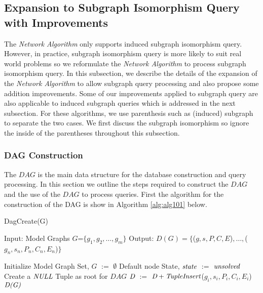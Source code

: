 \subsection{Expansion to Subgraph Isomorphism Query with Improvements}
The \textit{Network Algorithm} only supports induced subgraph isomorphism query. However, in practice,  subgraph isomorphism query is more likely to suit
real world problems so we reformulate the \textit{Network Algorithm} to process subgraph isomorphism query.
In this subsection, we describe the details of the expansion of the \textit{Network Algorithm} to allow subgraph query processing and also propose some addition improvements.
Some of our improvements applied to subgraph query are also applicable to induced subgraph queries which is addressed in the next subsection.
For these algorithms, we use parenthesis such as (induced) subgraph to separate the two cases. We first discuss the subgraph isomorphism so ignore the 
inside of the parentheses throughout this subsection.

\subsubsection{DAG Construction}
The $DAG$ is the main data structure for the database construction and query processing. In this section we outline the steps required to construct 
the $DAG$ and the use of the $DAG$ to process queries. First the algorithm for the construction of the DAG is show in Algorithm \ref{alg:alg101} below.


\begin{algorithm}
\caption{DagCreate(G)}
\label{alg:alg101}
\begin{algorithmic}
\STATE Input: Model Graphs $G$=$\{g_1,g_2,\dots,g_m\}$
\STATE Output: $D(G)= \{$($g,s,P,C,E$)$,\ldots,$($g_n,s_n,P_n,C_n,E_n$)$ \}$
\end{algorithmic}
\begin{algorithmic}[1]
\STATE Initialize Model Graph Set, $G$ $:=$ $\emptyset$
\STATE Default node State, $\emph{state}$ $:=$ $\emph{unsolved}$
\STATE Create a $\emph{NULL}$ Tuple as root for $DAG$
 \STATE  $\emph{D}$ $:=$ $\emph{D} + \emph{TupleInsert}$($g_i,s_i,P_i,C_i,E_i$)
\ENDFOR
\RETURN $\emph{D(G)}$
\end{algorithmic}
\end{algorithm}


